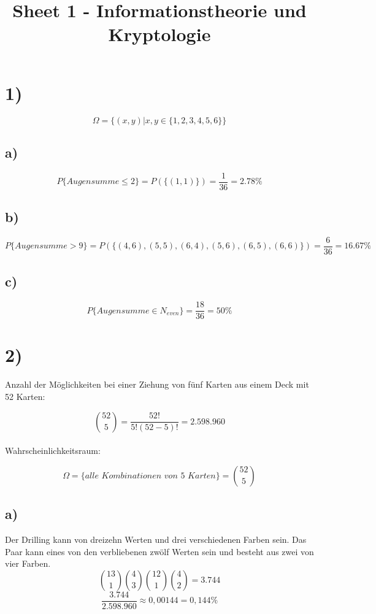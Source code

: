 \documentclass{article}
\begin{document}
  \title{Sheet 1 - Informationstheorie und Kryptologie}
  \date{}
  \author{}

  \maketitle

\section*{1)}
  \[ \Omega = \{(x,y) |x,y \in \{ 1,2,3,4,5,6 \} \} \]

  \subsection*{a)}
    \[ P \{ Augensumme \leq 2 \} = P(\{ (1,1)\} ) = \frac{1}{36} = 2.78 \% \]

  \subsection*{b)}
    \[ P \{ Augensumme > 9 \} = P(\{ (4,6), (5,5), (6,4), (5,6), (6,5), (6,6)\} ) = \frac{6}{36} = 16.67 \% \]

  \subsection*{c)}
    \[ P \{ Augensumme \in N_{even} \} = \frac{18}{36} = 50 \% \]

\section*{2)}
  Anzahl der Möglichkeiten bei einer Ziehung von fünf Karten aus einem Deck mit 52 Karten:

  \[ \binom{52}{5} = \frac{52!}{5!(52-5)!} = 2.598.960 \]
  \\
  Wahrscheinlichkeitsraum:

  \[ \Omega = \{ \textit{alle Kombinationen von 5 Karten} \} = \binom{52}{5} \]

  \subsection*{a)}
    Der Drilling kann von dreizehn Werten und drei verschiedenen Farben sein. Das Paar kann eines von den verbliebenen zwölf Werten sein und besteht aus zwei von vier Farben.
    \\
    \[ \binom{13}{1}\binom{4}{3}\binom{12}{1}\binom{4}{2} = 3.744 \]
    \[ \frac{3.744}{2.598.960} \approx 0,00144 = 0,144 \% \]
\end{document}
